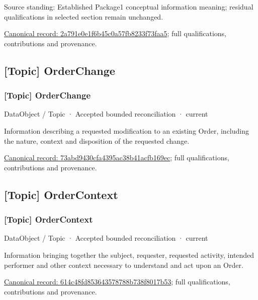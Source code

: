 Source standing: Established Package1 conceptual information meaning; residual qualifications in selected section remain unchanged.


{\footnotesize \href{../../../../continuum/application/data-object/topic/2a791e0e1f6b45c0a57fb8233f73faa5.md}{Canonical record: 2a791e0e1f6b45c0a57fb8233f73faa5}; full qualifications, contributions and provenance.}\par
\subsection{[Topic] OrderChange}

\subsubsection{[Topic] OrderChange}

\label{element:73abd9430cfa4395ac38b41acfb169ec}
{\small DataObject / Topic · Accepted bounded reconciliation · current}\par

Information describing a requested modification to an existing Order, including the nature, context and disposition of the requested change.


{\footnotesize \href{../../../../continuum/application/data-object/topic/73abd9430cfa4395ac38b41acfb169ec.md}{Canonical record: 73abd9430cfa4395ac38b41acfb169ec}; full qualifications, contributions and provenance.}\par
\subsection{[Topic] OrderContext}

\subsubsection{[Topic] OrderContext}

\label{element:614c48fd853643578788b738f8017b53}
{\small DataObject / Topic · Accepted bounded reconciliation · current}\par

Information bringing together the subject, requester, requested activity, intended performer and other context necessary to understand and act upon an Order.


{\footnotesize \href{../../../../continuum/application/data-object/topic/614c48fd853643578788b738f8017b53.md}{Canonical record: 614c48fd853643578788b738f8017b53}; full qualifications, contributions and provenance.}\par
